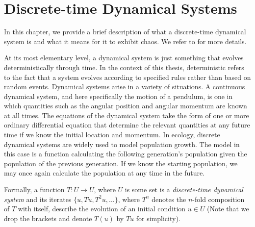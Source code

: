 \documentclass[12 pt]{article}
\begin{document}
\section{Discrete-time Dynamical Systems}

In this chapter, we provide a brief description of what a discrete-time dynamical system is and what it means for it to exhibit chaos. We refer to \cite{devaney2018introduction, de2013elements} for more details. 

At its most elementary level, a dynamical system is just something that evolves deterministically through time. In the context of this thesis, deterministic refers to the fact that a system evolves according to specified rules rather than based on random events. 
Dynamical systems arise in a variety of situations. A continuous dynamical system, and here specifically the motion of a pendulum, is one in which quantities such as the angular position and angular momentum are known at all times. 
The equations of the dynamical system take the form of one or more ordinary differential equation that determine the relevant quantities at any future time if we know the initial location and momentum. 
In ecology, discrete dynamical systems are widely used to model population growth. The model in this case is a function calculating the following generation's population given the population of the previous generation. If we know the starting population, we may once again calculate the population at any time in the future. 

Formally, a function $T: U \to U$, where $U$ is some set is  a \emph{discrete-time dynamical system} and its iterates $\{u,Tu,T^2u,\ldots\}$, where $T^n$ denotes the $n$-fold composition of $T$ with itself, describe the evolution of an initial condition $u\in U$ (Note that we drop the brackets and denote $T(u)$ by $Tu$ for simplicity).  
\end{document}
